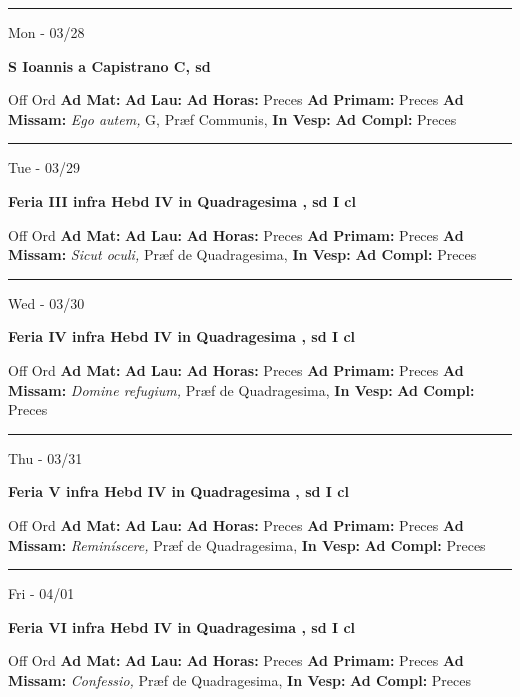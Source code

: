 \documentclass[letterpaper, 10pt]{article}
\begin{document}
\hrule
\begin{center}
Mon - 03/28
\end{center}\textbf{ \large S Ioannis a Capistrano C, \textnormal{\normalsize sd}}
\begin{justify}
Off Ord
\textbf{Ad Mat: }
\textbf{Ad Lau: }
\textbf{Ad Horas: }Preces
\textbf{Ad Primam: }Preces
\textbf{Ad Missam:} \textit{Ego autem, } G, Præf Communis, 
\textbf{In Vesp: }
\textbf{Ad Compl: }Preces\end{justify}



\hrule
\begin{center}
Tue - 03/29
\end{center}\textbf{ \large Feria III infra Hebd IV in Quadragesima , \textnormal{\normalsize sd I cl}}
\begin{justify}
Off Ord
\textbf{Ad Mat: }
\textbf{Ad Lau: }
\textbf{Ad Horas: }Preces
\textbf{Ad Primam: }Preces
\textbf{Ad Missam:} \textit{Sicut oculi, } Præf de Quadragesima, 
\textbf{In Vesp: }
\textbf{Ad Compl: }Preces\end{justify}



\hrule
\begin{center}
Wed - 03/30
\end{center}\textbf{ \large Feria IV infra Hebd IV in Quadragesima , \textnormal{\normalsize sd I cl}}
\begin{justify}
Off Ord
\textbf{Ad Mat: }
\textbf{Ad Lau: }
\textbf{Ad Horas: }Preces
\textbf{Ad Primam: }Preces
\textbf{Ad Missam:} \textit{Domine refugium, } Præf de Quadragesima, 
\textbf{In Vesp: }
\textbf{Ad Compl: }Preces\end{justify}



\hrule
\begin{center}
Thu - 03/31
\end{center}\textbf{ \large Feria V infra Hebd IV in Quadragesima , \textnormal{\normalsize sd I cl}}
\begin{justify}
Off Ord
\textbf{Ad Mat: }
\textbf{Ad Lau: }
\textbf{Ad Horas: }Preces
\textbf{Ad Primam: }Preces
\textbf{Ad Missam:} \textit{Reminíscere, } Præf de Quadragesima, 
\textbf{In Vesp: }
\textbf{Ad Compl: }Preces\end{justify}



\hrule
\begin{center}
Fri - 04/01
\end{center}\textbf{ \large Feria VI infra Hebd IV in Quadragesima , \textnormal{\normalsize sd I cl}}
\begin{justify}
Off Ord
\textbf{Ad Mat: }
\textbf{Ad Lau: }
\textbf{Ad Horas: }Preces
\textbf{Ad Primam: }Preces
\textbf{Ad Missam:} \textit{Confessio, } Præf de Quadragesima, 
\textbf{In Vesp: }
\textbf{Ad Compl: }Preces\end{justify}
\end{document}
